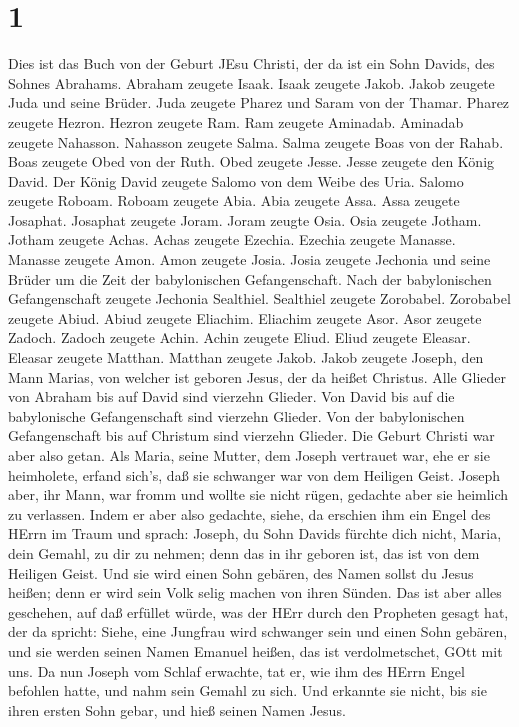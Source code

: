 \hypertarget{section}{%
\section{1}\label{section}}

 Dies ist das Buch von der Geburt JEsu Christi, der da ist
ein Sohn Davids, des Sohnes Abrahams.  Abraham zeugete
Isaak. Isaak zeugete Jakob. Jakob zeugete Juda und seine Brüder.
 Juda zeugete Pharez und Saram von der Thamar. Pharez
zeugete Hezron. Hezron zeugete Ram.  Ram zeugete Aminadab.
Aminadab zeugete Nahasson. Nahasson zeugete Salma.  Salma
zeugete Boas von der Rahab. Boas zeugete Obed von der Ruth. Obed zeugete
Jesse.  Jesse zeugete den König David. Der König David
zeugete Salomo von dem Weibe des Uria.  Salomo zeugete
Roboam. Roboam zeugete Abia. Abia zeugete Assa.  Assa
zeugete Josaphat. Josaphat zeugete Joram. Joram zeugte Osia.
 Osia zeugete Jotham. Jotham zeugete Achas. Achas zeugete
Ezechia.  Ezechia zeugete Manasse. Manasse zeugete Amon.
Amon zeugete Josia.  Josia zeugete Jechonia und seine
Brüder um die Zeit der babylonischen Gefangenschaft.  Nach
der babylonischen Gefangenschaft zeugete Jechonia Sealthiel. Sealthiel
zeugete Zorobabel.  Zorobabel zeugete Abiud. Abiud zeugete
Eliachim. Eliachim zeugete Asor.  Asor zeugete Zadoch.
Zadoch zeugete Achin. Achin zeugete Eliud.  Eliud zeugete
Eleasar. Eleasar zeugete Matthan. Matthan zeugete Jakob. 
Jakob zeugete Joseph, den Mann Marias, von welcher ist geboren Jesus,
der da heißet Christus.  Alle Glieder von Abraham bis auf
David sind vierzehn Glieder. Von David bis auf die babylonische
Gefangenschaft sind vierzehn Glieder. Von der babylonischen
Gefangenschaft bis auf Christum sind vierzehn Glieder.  Die
Geburt Christi war aber also getan. Als Maria, seine Mutter, dem Joseph
vertrauet war, ehe er sie heimholete, erfand sich's, daß sie schwanger
war von dem Heiligen Geist.  Joseph aber, ihr Mann, war
fromm und wollte sie nicht rügen, gedachte aber sie heimlich zu
verlassen.  Indem er aber also gedachte, siehe, da erschien
ihm ein Engel des HErrn im Traum und sprach: Joseph, du Sohn Davids
fürchte dich nicht, Maria, dein Gemahl, zu dir zu nehmen; denn das in
ihr geboren ist, das ist von dem Heiligen Geist.  Und sie
wird einen Sohn gebären, des Namen sollst du Jesus heißen; denn er wird
sein Volk selig machen von ihren Sünden.  Das ist aber
alles geschehen, auf daß erfüllet würde, was der HErr durch den
Propheten gesagt hat, der da spricht:  Siehe, eine Jungfrau
wird schwanger sein und einen Sohn gebären, und sie werden seinen Namen
Emanuel heißen, das ist verdolmetschet, GOtt mit uns.  Da
nun Joseph vom Schlaf erwachte, tat er, wie ihm des HErrn Engel befohlen
hatte, und nahm sein Gemahl zu sich.  Und erkannte sie
nicht, bis sie ihren ersten Sohn gebar, und hieß seinen Namen Jesus.

